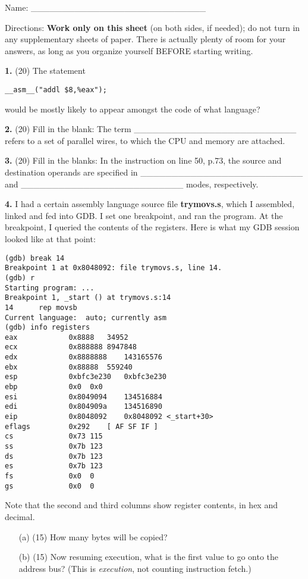 \documentclass[twocolumn]{article}
\begin{document}
Name: \_\_\_\_\_\_\_\_\_\_\_\_\_\_\_\_\_\_\_\_\_\_\_\_\_\_\_\_

Directions: {\bf Work only on this sheet} (on both sides, if needed); do not
turn in any supplementary sheets of paper. There is actually plenty of room
for your answers, as long as you organize yourself BEFORE starting writing.

{\bf 1.} (20) The statement

\begin{Verbatim}[fontsize=\relsize{-2}]
 __asm__("addl $8,%eax");
\end{Verbatim}

would be mostly likely to appear amongst the code of what language?

{\bf 2.} (20) Fill in the blank:  The term
\_\_\_\_\_\_\_\_\_\_\_\_\_\_\_\_\_\_\_\_\_\_\_\_\_\_ refers to a set of
parallel wires, to which the CPU and memory are attached.

{\bf 3.} (20) Fill in the blanks:  In the instruction on line 50, p.73,
the source and destination operands are specified in
\_\_\_\_\_\_\_\_\_\_\_\_\_\_\_\_\_\_\_\_\_\_\_\_\_\_ and
\_\_\_\_\_\_\_\_\_\_\_\_\_\_\_\_\_\_\_\_\_\_\_\_\_\_ modes,
respectively.

{\bf 4.} I had a certain assembly language source file {\bf trymovs.s},
which I assembled, linked and fed into GDB.  I set one breakpoint, and
ran the program.  At the breakpoint, I queried the contents of the
registers.  Here is what my GDB session looked like at that point:

\begin{Verbatim}[fontsize=\relsize{-2}]
(gdb) break 14
Breakpoint 1 at 0x8048092: file trymovs.s, line 14.
(gdb) r
Starting program: ...
Breakpoint 1, _start () at trymovs.s:14
14	    rep movsb          
Current language:  auto; currently asm
(gdb) info registers
eax            0x8888	34952
ecx            0x888888	8947848
edx            0x8888888	143165576
ebx            0x88888	559240
esp            0xbfc3e230	0xbfc3e230
ebp            0x0	0x0
esi            0x8049094	134516884
edi            0x804909a	134516890
eip            0x8048092	0x8048092 <_start+30>
eflags         0x292	[ AF SF IF ]
cs             0x73	115
ss             0x7b	123
ds             0x7b	123
es             0x7b	123
fs             0x0	0
gs             0x0	0
\end{Verbatim}

Note that the second and third columns show register contents, in hex
and decimal.

\begin{itemize}

\item [(a)] (15) How many bytes will be copied?

\item [(b)] (15) Now resuming execution, what is the first value to go
onto the address bus?  (This is {\it execution}, not counting
instruction fetch.)

\end{itemize}
\end{document}
